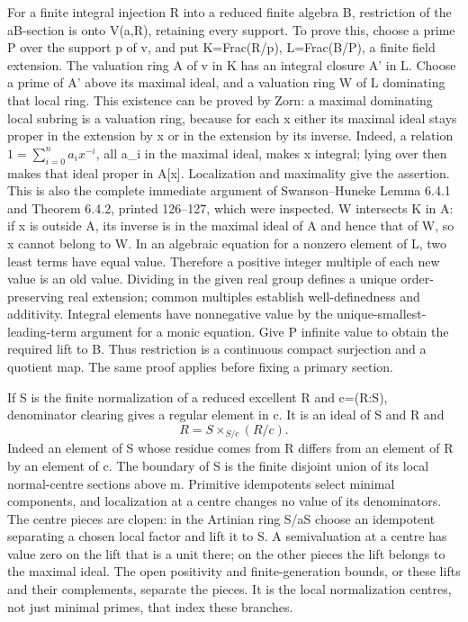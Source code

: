 \documentclass[11pt]{article}
\begin{document}
For a finite integral injection R into a reduced finite algebra B, restriction of the aB-section is onto V(a,R), retaining every support. To prove this, choose a prime P over the support p of v, and put K=Frac(R/p), L=Frac(B/P), a finite field extension. The valuation ring A of v in K has an integral closure A' in L. Choose a prime of A' above its maximal ideal, and a valuation ring W of L dominating that local ring. This existence can be proved by Zorn: a maximal dominating local subring is a valuation ring, because for each x either its maximal ideal stays proper in the extension by x or in the extension by its inverse. Indeed, a relation \(1=\sum_{i=0}^n a_i x^{-i}\), all a\_i in the maximal ideal, makes x integral; lying over then makes that ideal proper in A[x]. Localization and maximality give the assertion. This is also the complete immediate argument of Swanson--Huneke Lemma 6.4.1 and Theorem 6.4.2, printed 126--127, which were inspected. W intersects K in A: if x is outside A, its inverse is in the maximal ideal of A and hence that of W, so x cannot belong to W. In an algebraic equation for a nonzero element of L, two least terms have equal value. Therefore a positive integer multiple of each new value is an old value. Dividing in the given real group defines a unique order-preserving real extension; common multiples establish well-definedness and additivity. Integral elements have nonnegative value by the unique-smallest-leading-term argument for a monic equation. Give P infinite value to obtain the required lift to B. Thus restriction is a continuous compact surjection and a quotient map. The same proof applies before fixing a primary section.

If S is the finite normalization of a reduced excellent R and c=(R:S), denominator clearing gives a regular element in c. It is an ideal of S and R and
\[
 R=S\mathbin{\times}_{S/c}(R/c).
\]
Indeed an element of S whose residue comes from R differs from an element of R by an element of c. The boundary of S is the finite disjoint union of its local normal-centre sections above m. Primitive idempotents select minimal components, and localization at a centre changes no value of its denominators. The centre pieces are clopen: in the Artinian ring S/aS choose an idempotent separating a chosen local factor and lift it to S. A semivaluation at a centre has value zero on the lift that is a unit there; on the other pieces the lift belongs to the maximal ideal. The open positivity and finite-generation bounds, or these lifts and their complements, separate the pieces. It is the local normalization centres, not just minimal primes, that index these branches.
\end{document}

